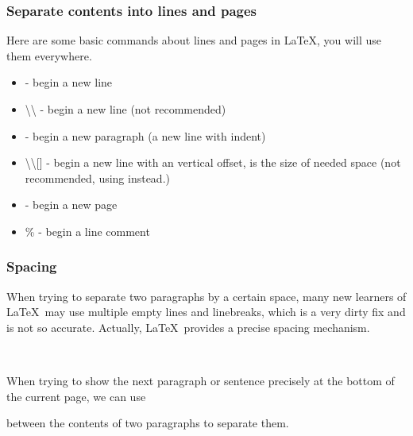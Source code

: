 \begin{frame}
    \frametitle{Separate contents into lines and pages}
    Here are some basic commands about lines and pages in \LaTeX,  you will use them everywhere.
    \begin{itemize}
        \item {} - begin a new line
        \item \alert{\textbackslash\textbackslash} - begin a new line (not recommended\footnotemark[1])
        \item {} - begin a new paragraph (a new line with indent)
        \item \alert{\textbackslash\textbackslash [}\alert{]} - begin a new line with an vertical offset,  is the size of needed space  (not recommended, using  \LC{\vspace} instead.)
        \item {} - begin a new page
        \item \alert{\%} - begin a line comment
    \end{itemize}
\end{frame}

\begin{frame}[fragile]
    \frametitle{Spacing}
    When trying to separate two paragraphs by a certain space, many new learners of \LaTeX\ may use multiple empty lines and linebreaks, which is a very dirty fix and is not so accurate. Actually, \LaTeX\ provides a precise spacing mechanism.
    \begin{command}
        \LC{\vspace{space}}\\
        \LC{\vspace*{space}}
    \end{command}
    When trying to show the next paragraph or sentence precisely at the bottom of the current page, we can use
    \begin{command}
        \LC{\vfill}
    \end{command}
    between the contents of two paragraphs to separate them.
\end{frame}

